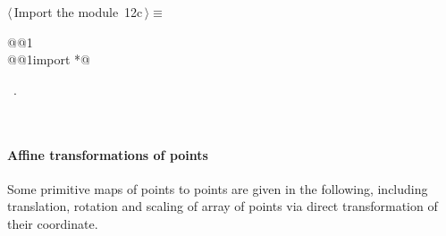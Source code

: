 \documentclass[11pt,oneside]{article}	%
\begin{document}
\begin{flushleft} \small
\begin{minipage}{\linewidth} \label{scrap37}
\protect{}$\langle\,$Import the module\nobreak\ {\footnotesize 12c}$\,\rangle\equiv$
\vspace{-1ex}
\begin{list}{}{} \item
\mbox{}\verb@import @@1\verb@@\\
\mbox{}\verb@from @@1\verb@ import *@\\
\mbox{}\verb@@{\NWsep}
\end{list}
\vspace{-1ex}
\footnotesize\addtolength{\baselineskip}{-1ex}
\begin{list}{}{\setlength{\itemsep}{-\parsep}\setlength{\itemindent}{-\leftmargin}}
\item \NWtxtMacroRefIn\ .
\end{list}
\end{minipage}\\[4ex]
\end{flushleft}

\paragraph{Affine transformations of points} Some primitive maps of points to points are given in the following, including translation, rotation and scaling of array of points via direct transformation of their coordinate.
\end{document}
